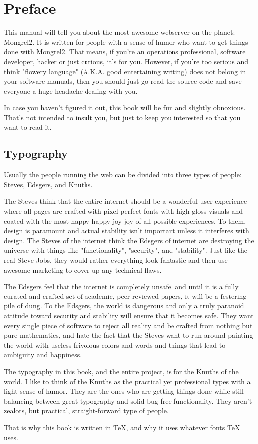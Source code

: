\chapter{Preface}

This manual will tell you about the most awesome webserver on the planet:
Mongrel2.  It is written for people with a sense of humor who want to get
things done with Mongrel2.  That means, if you're an operations professional,
software developer, hacker or just curious, it's for you.  However, if you're
too serious and think "flowery language" (A.K.A. good entertaining writing) does
not belong in your software manuals, then you should just go read the source
code and save everyone a huge headache dealing with you.

In case you haven't figured it out, this book will be fun and slightly
obnoxious.  That's not intended to insult you, but just to keep you interested
so that you want to read it.


\section*{Typography}

Usually the people running the web can be divided into three types of people:  Steves,
Edsgers, and Knuths.

The Steves think that the entire internet should be a wonderful user experience
where all pages are crafted with pixel-perfect fonts with high gloss visuals
and coated with the most happy happy joy joy of all possible experiences.  To
them, design is paramount and actual stability isn't important unless it
interferes with design.  The Steves of the internet think the Edsgers of
internet are destroying the universe with things like "functionality",
"security", and "stability".  Just like the real Steve Jobs, they would rather
everything look fantastic and then use awesome marketing to cover up any
technical flaws.

The Edsgers feel that the internet is completely unsafe, and until it is a fully
curated and crafted set of academic, peer reviewed papers, it will be a festering
pile of dung.  To the Edsgers, the world is dangerous and only a truly paranoid
attitude toward security and stability will ensure that it becomes safe.  They
want every single piece of software to reject all reality and be crafted from
nothing but pure mathematics, and hate the fact that the Steves want to run
around painting the world with useless frivolous colors and words and things
that lead to ambiguity and happiness.

The typography in this book, and the entire project, is for the Knuths of the
world.  I like to think of the Knuths as the practical yet professional types
with a light sense of humor.  They are the ones who are getting things done
while still balancing between great typography and solid bug-free
functionality.  They aren't zealots, but practical, straight-forward type of
people.

That is why this book is written in \TeX, and why it uses whatever fonts \TeX{} uses.

